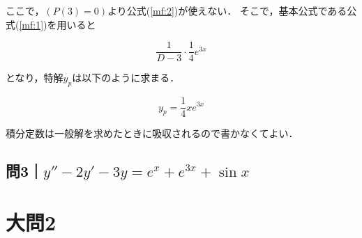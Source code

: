 \documentclass[a4paper,11pt]{bxjsarticle}
\begin{document}
ここで，$(P(3)= 0)$より公式(\ref{mf:2})が使えない．
そこで，基本公式である公式(\ref{mf:1})を用いると

\begin{equation}
  \frac{1}{D-3}\cdot\frac{1}{4}e^{3x}
\end{equation}

となり，特解$y_p$は以下のように求まる．

\begin{equation}
  y_p=\frac{1}{4}xe^{3x}
\end{equation}

積分定数は一般解を求めたときに吸収されるので書かなくてよい．

\subsection{問3｜$y''-2y'-3y=e^x+e^{3x}+\sin x$}

\section{大問2}
\subsection{}




 
\end{document}

